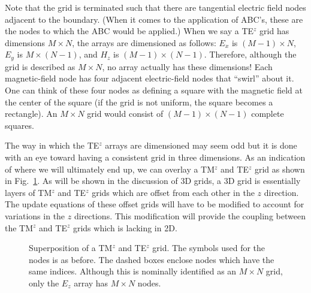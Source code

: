 Note that the grid is terminated such that there are tangential
electric field nodes adjacent to the boundary.  (When it comes to the
application of ABC's, these are the nodes to which the ABC would be
applied.)  When we say a TE$^z$ grid has dimensions $M\times N$, the
arrays are dimensioned as follows: $E_x$ is $(M-1)\times N$, $E_y$ is
$M\times (N-1)$, and $H_z$ is $(M-1)\times (N-1)$.  Therefore,
although the grid is described as $M\times N$, no array actually has
these dimensions!  Each magnetic-field node has four adjacent
electric-field nodes that ``swirl'' about it.  One can think of these
four nodes as defining a square with the magnetic field at the center
of the square (if the grid is not uniform, the square becomes a
rectangle).  An $M\times N$ grid would consist of $(M-1)\times (N-1)$
complete squares.

The way in which the TE$^z$ arrays are dimensioned may seem odd but it
is done with an eye toward having a consistent grid in three
dimensions.  As an indication of where we will ultimately end up, we
can overlay a TM$^z$ and TE$^z$ grid as shown in Fig.\
\ref{fig:teTmOverlay}.  As will be shown in the discussion of 3D
grids, a 3D grid is essentially layers of TM$^z$ and TE$^z$ grids
which are offset from each other in the $z$ direction.  The update
equations of these offset grids will have to be modified to account
for variations in the $z$ directions.  This modification will provide
the coupling between the TM$^z$ and TE$^z$ grids which is lacking in
2D.

\begin{figure}
  \begin{center}
  \end{center} 
  \caption{Superposition of a TM$^z$ and TE$^z$ grid.  The symbols
  used for the nodes is as before.  The dashed boxes enclose nodes
  which have the same indices.  Although this is nominally identified
  as an $M\times N$ grid, only the $E_z$ array has $M\times N$ nodes.}
  \label{fig:teTmOverlay}
\end{figure}

